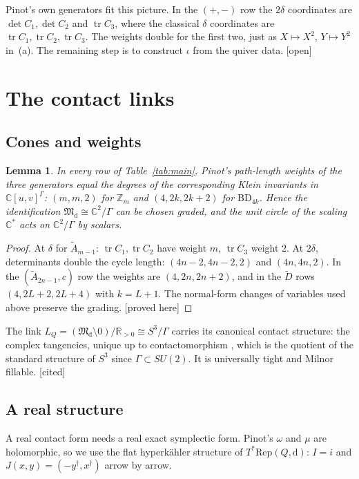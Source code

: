 \documentclass[11pt]{article}
\newtheorem{lemma}[theorem]{Lemma}
\theoremstyle{definition}
\theoremstyle{remark}
\newcommand{\tagP}{\textsf{\small[proved here]}}
\newcommand{\tagC}{\textsf{\small[cited]}}
\newcommand{\tagO}{\textsf{\small\textcolor{red!70!black}{[open]}}}
\newcommand{\C}{\mathbb{C}}\newcommand{\R}{\mathbb{R}}\newcommand{\Z}{\mathbb{Z}}
\newcommand{\M}{\mathfrak{M}}\newcommand{\Rep}{\mathrm{Rep}}\newcommand{\SRep}{\mathrm{SRep}}
\newcommand{\BD}{\mathrm{BD}}
\begin{document}
Pinot's own generators fit this picture. In the $(+,-)$ row the $2\delta$ coordinates are $\det C_1,\det C_2$ and $\operatorname{tr}C_3$, where the classical $\delta$ coordinates are $\operatorname{tr}C_1,\operatorname{tr}C_2,\operatorname{tr}C_3$. The weights double for the first two, just as $X\mapsto X^2$, $Y\mapsto Y^2$ in~(a). The remaining step is to construct $\iota$ from the quiver data. \tagO

\section{The contact links}\label{sec:links}

\subsection{Cones and weights}
\begin{lemma}\label{lem:weights}
In every row of Table~\ref{tab:main}, Pinot's path-length weights of the three generators equal the degrees of the corresponding Klein invariants in $\C[u,v]^\Gamma$: $(m,m,2)$ for $\Z_m$ and $(4,2k,2k+2)$ for $\BD_{4k}$. Hence the identification $\M_{\mathrm d}\cong\C^2/\Gamma$ can be chosen graded, and the unit circle of the scaling $\C^*$ acts on $\C^2/\Gamma$ by scalars.
\end{lemma}
\begin{proof}
At $\delta$ for $\widetilde A_{m-1}$: $\operatorname{tr}C_1,\operatorname{tr}C_2$ have weight $m$, $\operatorname{tr}C_3$ weight $2$. At $2\delta$, determinants double the cycle length: $(4n-2,4n-2,2)$ and $(4n,4n,2)$. In the $(\widetilde A_{2n-1},c)$ row the weights are $(4,2n,2n+2)$, and in the $\widetilde D$ rows $(4,2L+2,2L+4)$ with $k=L+1$. The normal-form changes of variables used above preserve the grading. \tagP
\end{proof}

The link $L_Q=(\M_{\mathrm d}\setminus0)/\R_{>0}\cong S^3/\Gamma$ carries its canonical contact structure: the complex tangencies, unique up to contactomorphism \cite{CNPP}, which is the quotient of the standard structure of $S^3$ since $\Gamma\subset SU(2)$. It is universally tight and Milnor fillable. \tagC

\subsection{A real structure}
A real contact form needs a real exact symplectic form. Pinot's $\omega$ and $\mu$ are holomorphic, so we use the flat hyperk\"ahler structure of $T^*\Rep(Q,\mathrm d)$: $I=i$ and $J(x,y)=(-y^\dagger,x^\dagger)$ arrow by arrow.
\end{document}
